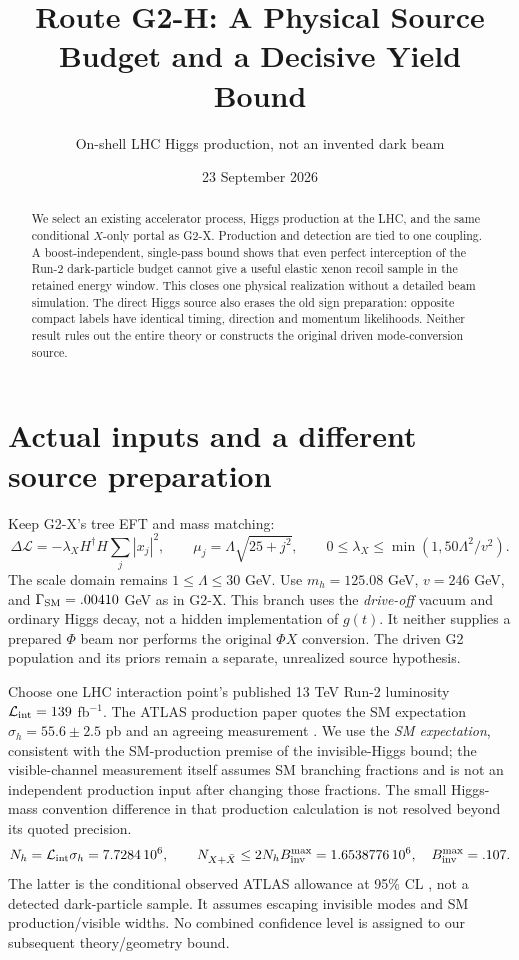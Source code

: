 \documentclass[11pt,a4paper]{article}
\title{Route G2-H: A Physical Source Budget and a Decisive Yield Bound}
\author{On-shell LHC Higgs production, not an invented dark beam}
\date{23 September 2026}
\begin{document}
\maketitle
\begin{abstract}
We select an existing accelerator process, Higgs production at the LHC,
and the same conditional $X$-only portal as G2-X. Production and detection
are tied to one coupling. A boost-independent, single-pass bound shows
that even perfect interception of the Run-2 dark-particle budget cannot
give a useful elastic xenon recoil sample in the retained energy window.
This closes one physical realization without a detailed beam simulation.
The direct Higgs source also erases the old sign preparation: opposite
compact labels have identical timing, direction and momentum likelihoods.
Neither result rules out the entire theory or constructs the original
driven mode-conversion source.
\end{abstract}

\section{Actual inputs and a different source preparation}
Keep G2-X's tree EFT and mass matching:
\begin{equation}
 \Delta\mathcal L=-\lambda_X H^\dagger H\sum_j|x_j|^2,\qquad
 \mu_j=\Lambda\sqrt{25+j^2},\qquad
 0\leq\lambda_X\leq\min(1,50\Lambda^2/v^2).
\end{equation}
The scale domain remains $1\leq\Lambda\leq30$ GeV. Use $m_h=125.08$ GeV,
$v=246$ GeV, and $\Gamma_{\rm SM}=.00410$ GeV as in G2-X. This branch
uses the \emph{drive-off} vacuum and ordinary Higgs decay, not a hidden
implementation of $g(t)$. It neither supplies a prepared $\Phi$ beam
nor performs the original $\Phi X$ conversion. The driven G2 population
and its priors remain a separate, unrealized source hypothesis.

Choose one LHC interaction point's published 13 TeV Run-2 luminosity
$\mathcal L_{\rm int}=139$ fb$^{-1}$. The ATLAS production paper quotes
the SM expectation $\sigma_h=55.6\pm2.5$ pb and an agreeing measurement
\cite{production}. We use the \emph{SM expectation}, consistent with the
SM-production premise of the invisible-Higgs bound; the visible-channel
measurement itself assumes SM branching fractions and is not an
independent production input after changing those fractions.
The small Higgs-mass convention difference in that production calculation
is not resolved beyond its quoted precision.
\begin{equation}\label{eq:budget}
 N_h=\mathcal L_{\rm int}\sigma_h=7.7284\,10^6,\qquad
 N_{X+\bar X}\leq2N_h B_{\rm inv}^{\max}=1.6538776\,10^6,
 \quad B_{\rm inv}^{\max}=.107 .
\end{equation}
The latter is the conditional observed ATLAS allowance at 95\% CL
\cite{invisible}, not a detected dark-particle sample. It assumes escaping
invisible modes and SM production/visible widths. No combined confidence
level is assigned to our subsequent theory/geometry bound.
\end{document}
